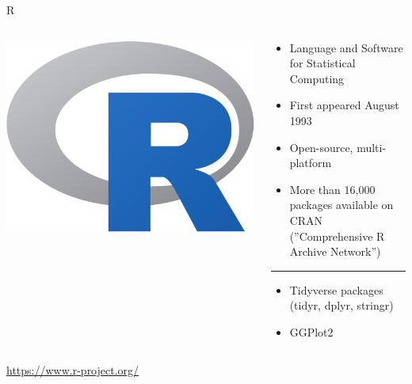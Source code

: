 \documentclass[ignorenonframetext,xcolor=dvipsnames]{beamer}
\begin{document}
\begin{frame}{R}

\begin{columns}
\begin{column}{.25\textwidth}
\includegraphics[width=\columnwidth]{R_logo.png}
\end{column}
\begin{column}{.75\textwidth}
  \begin{itemize}
    \item Language and Software for Statistical Computing
    \item First appeared August 1993
    \item Open-source, multi-platform
    \item More than 16,000 packages available on CRAN (''Comprehensive R Archive Network'')
  \end{itemize}
  \vspace{2mm} \rule{\columnwidth}{1pt}
  \vspace{2mm}
  \begin{itemize}
     \item Tidyverse packages (tidyr, dplyr, stringr)
     \item GGPlot2
  \end{itemize}
\end{column}
\end{columns}
  \vspace{1cm}
\url{https://www.r-project.org/} \\
\end{frame}
\end{document}
